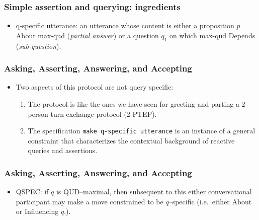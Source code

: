 \documentclass{beamer}
\newcommand{\bit}{\begin{itemize}}
\newcommand{\eit}{\end{itemize}}
\newcommand{\ben}{\begin{enumerate}}
\newcommand{\een}{\end{enumerate}}
\begin{document}
\begin{frame}\frametitle{Simple assertion and querying: ingredients}


\begin{itemize}
\item q-specific utterance: an utterance whose content is either a proposition $p$ {\sf
About} max-qud (\emph{partial answer}) or a question $q_1$ on which
max-qud {\sf Depends} (\emph{sub-question}).





\end{itemize}

 \end{frame}

\begin{frame}[label=qspec]\frametitle{Asking, Asserting, Answering, and Accepting}

\bit

\item Two aspects of this protocol are not query specific:

\ben \item The protocol is like the ones we have seen for greeting
and parting a 2-person turn exchange protocol (2-PTEP).

\item The specification {\tt make
  q-specific utterance} is an instance of a general constraint that characterizes
   the contextual background of reactive queries and
assertions.

\een
\eit
\end{frame}

\begin{frame}\frametitle{Asking, Asserting, Answering, and Accepting}

\bit
\item QSPEC: if $q$ is
QUD--maximal, then subsequent to this either conversational
participant may make a move constrained to be $q$--specific (i.e.\
either About or Influencing $q$.).



\eit







\end{frame}
\end{document}
